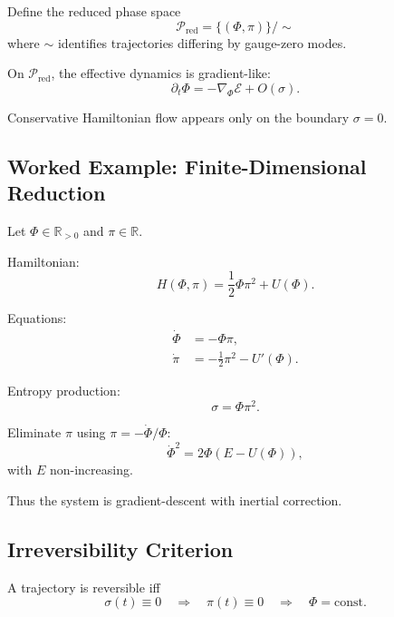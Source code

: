 \documentclass[11pt]{article}
\begin{document}
Define the reduced phase space
\begin{equation}
\mathcal{P}_{\text{red}}
=
\{ (\Phi,\pi) \} / \sim
\end{equation}
where $\sim$ identifies trajectories differing by gauge-zero modes.

On $\mathcal{P}_{\text{red}}$, the effective dynamics is gradient-like:
\begin{equation}
\partial_t \Phi = - \nabla_\Phi \mathcal{E} + O(\sigma).
\end{equation}

Conservative Hamiltonian flow appears only on the boundary $\sigma = 0$.

\subsection*{Worked Example: Finite-Dimensional Reduction}

Let $\Phi \in \mathbb{R}_{>0}$ and $\pi \in \mathbb{R}$.

Hamiltonian:
\begin{equation}
H(\Phi,\pi) = \frac{1}{2}\Phi \pi^2 + U(\Phi).
\end{equation}

Equations:
\begin{align}
\dot{\Phi} &= -\Phi \pi, \\
\dot{\pi} &= -\frac{1}{2}\pi^2 - U'(\Phi).
\end{align}

Entropy production:
\begin{equation}
\sigma = \Phi \pi^2.
\end{equation}

Eliminate $\pi$ using $\pi = -\dot{\Phi}/\Phi$:
\begin{equation}
\dot{\Phi}^2 = 2\Phi\left(E - U(\Phi)\right),
\end{equation}
with $E$ non-increasing.

Thus the system is gradient-descent with inertial correction.

\subsection*{Irreversibility Criterion}

A trajectory is reversible iff
\begin{equation}
\sigma(t) \equiv 0
\quad\Rightarrow\quad
\pi(t)\equiv 0
\quad\Rightarrow\quad
\Phi = \text{const}.
\end{equation}
\end{document}
